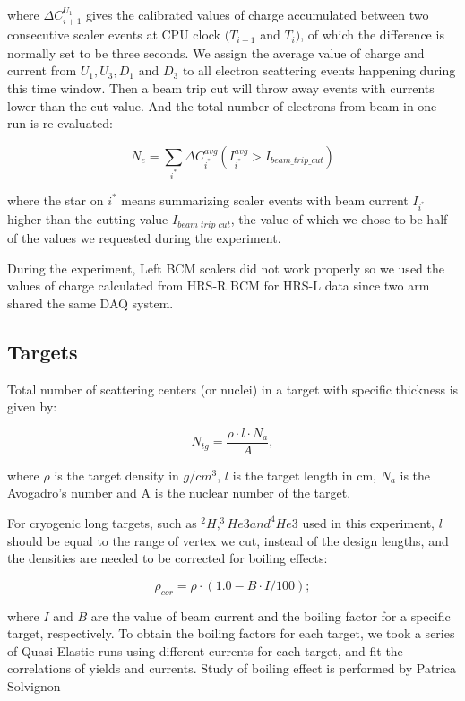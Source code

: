 \documentclass[a4paper,10.5pt]{article}
\begin{document}
where $\Delta C_{i+1}^{U_{1}}$ gives the calibrated values of charge accumulated between two consecutive scaler events at CPU clock $(T_{i+1}$ and $T_{i})$, of which the difference is normally set to be three seconds. We assign the average value of charge and current from $U_{1}, U_{3}, D_{1}$ and $D_{3}$ to all electron scattering events happening during this time window. Then a beam trip cut will throw away events with currents lower than the cut value. And the total number of electrons from beam in one run is re-evaluated:

\begin{equation}
  N_{e} = \sum_{i^{*}} \Delta C_{i^{*}}^{avg}(I_{i^{*}}^{avg}>I_{beam\_trip\_cut}) 
\end{equation}

where the star on $i^{*}$ means summarizing scaler events with beam current $I_{i^{*}}$ higher than the cutting value $I_{beam\_trip\_cut}$, the value of which we chose to be half of the values we requested during the experiment.

During the experiment, Left BCM scalers did not work properly so we used the values of charge calculated from HRS-R BCM for HRS-L data since two arm shared the same DAQ system. 

\subsection{Targets}
Total number of scattering centers (or nuclei) in a target with specific thickness is given by:

\begin{equation}
 N_{tg} = \frac{\rho\cdot l \cdot N_{a}}{A},
\end{equation}

where $\rho$ is the target density in $g/cm^{3}$, $l$ is the target length in cm, $N_{a}$ is the Avogadro's number and A is the nuclear number of the target. 

For cryogenic long targets, such as $^{2}H, ^{3}He3 and ^{4}He3$ used in this experiment, $l$ should be equal to the range of vertex we cut, instead of the design lengths, and the densities are needed to be corrected for boiling effects:

\begin{equation}
  \rho_{cor} = \rho \cdot (1.0 - B \cdot I /100); 
\end{equation}

where $I$ and $B$ are the value of beam current and the boiling factor for a specific target, respectively. To obtain the boiling factors for each target, we took a series of Quasi-Elastic runs using different currents for each target, and fit the correlations of yields and currents. Study of boiling effect is performed by Patrica Solvignon %
\end{document}
